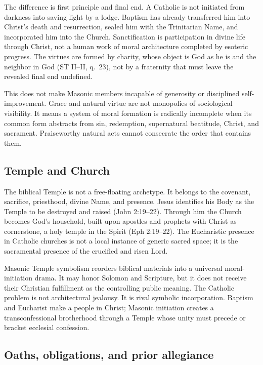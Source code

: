 The difference is first principle and final end. A Catholic is not initiated from darkness into saving light by a lodge. Baptism has already transferred him into Christ's death and resurrection, sealed him with the Trinitarian Name, and incorporated him into the Church. Sanctification is participation in divine life through Christ, not a human work of moral architecture completed by esoteric progress. The virtues are formed by charity, whose object is God as he is and the neighbor in God (ST II--II, q.~23), not by a fraternity that must leave the revealed final end undefined.

This does not make Masonic members incapable of generosity or disciplined self-improvement. Grace and natural virtue are not monopolies of sociological visibility. It means a system of moral formation is radically incomplete when its common form abstracts from sin, redemption, supernatural beatitude, Christ, and sacrament. Praiseworthy natural acts cannot consecrate the order that contains them.

\subsection{Temple and Church}

The biblical Temple is not a free-floating archetype. It belongs to the covenant, sacrifice, priesthood, divine Name, and presence. Jesus identifies his Body as the Temple to be destroyed and raised (John 2:19--22). Through him the Church becomes God's household, built upon apostles and prophets with Christ as cornerstone, a holy temple in the Spirit (Eph 2:19--22). The Eucharistic presence in Catholic churches is not a local instance of generic sacred space; it is the sacramental presence of the crucified and risen Lord.

Masonic Temple symbolism reorders biblical materials into a universal moral-initiation drama. It may honor Solomon and Scripture, but it does not receive their Christian fulfillment as the controlling public meaning. The Catholic problem is not architectural jealousy. It is rival symbolic incorporation. Baptism and Eucharist make a people in Christ; Masonic initiation creates a transconfessional brotherhood through a Temple whose unity must precede or bracket ecclesial confession.

\subsection{Oaths, obligations, and prior allegiance}

